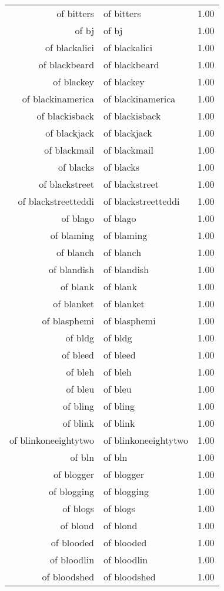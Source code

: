 \begin{table}[ht]
\begin{tabular}{rlr}
  of bitters & of bitters & 1.00 \\ 
  of bj & of bj & 1.00 \\ 
  of blackalici & of blackalici & 1.00 \\ 
  of blackbeard & of blackbeard & 1.00 \\ 
  of blackey & of blackey & 1.00 \\ 
  of blackinamerica & of blackinamerica & 1.00 \\ 
  of blackisback & of blackisback & 1.00 \\ 
  of blackjack & of blackjack & 1.00 \\ 
  of blackmail & of blackmail & 1.00 \\ 
  of blacks & of blacks & 1.00 \\ 
  of blackstreet & of blackstreet & 1.00 \\ 
  of blackstreetteddi & of blackstreetteddi & 1.00 \\ 
  of blago & of blago & 1.00 \\ 
  of blaming & of blaming & 1.00 \\ 
  of blanch & of blanch & 1.00 \\ 
  of blandish & of blandish & 1.00 \\ 
  of blank & of blank & 1.00 \\ 
  of blanket & of blanket & 1.00 \\ 
  of blasphemi & of blasphemi & 1.00 \\ 
  of bldg & of bldg & 1.00 \\ 
  of bleed & of bleed & 1.00 \\ 
  of bleh & of bleh & 1.00 \\ 
  of bleu & of bleu & 1.00 \\ 
  of bling & of bling & 1.00 \\ 
  of blink & of blink & 1.00 \\ 
  of blinkoneeightytwo & of blinkoneeightytwo & 1.00 \\ 
  of bln & of bln & 1.00 \\ 
  of blogger & of blogger & 1.00 \\ 
  of blogging & of blogging & 1.00 \\ 
  of blogs & of blogs & 1.00 \\ 
  of blond & of blond & 1.00 \\ 
  of blooded & of blooded & 1.00 \\ 
  of bloodlin & of bloodlin & 1.00 \\ 
  of bloodshed & of bloodshed & 1.00 \\ 

\end{tabular}
\end{table}
